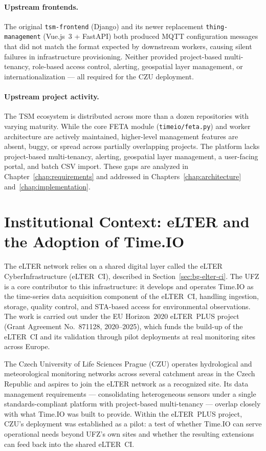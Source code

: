 \paragraph{Upstream frontends.}
The original \texttt{tsm-frontend} (Django) and its newer replacement \texttt{thing-management}
(Vue.js~3 + FastAPI) both produced MQTT configuration messages that did not match the format
expected by downstream workers, causing silent failures in infrastructure provisioning.
Neither provided project-based multi-tenancy, role-based access control, alerting, geospatial
layer management, or internationalization --- all required for the CZU deployment.

\paragraph{Upstream project activity.}
The TSM ecosystem is distributed across more than a dozen repositories with varying maturity.
While the core FETA module (\texttt{timeio/feta.py}) and worker architecture are actively
maintained, higher-level management features are absent, buggy, or spread across partially
overlapping projects. The platform lacks project-based multi-tenancy, alerting, geospatial
layer management, a user-facing portal, and batch CSV import. These gaps are analyzed in
Chapter~\ref{chap:requirements} and addressed in Chapters~\ref{chap:architecture}
and~\ref{chap:implementation}.

\section{Institutional Context: eLTER and the Adoption of Time.IO}
\label{sec:bg-elter-context}

The eLTER network relies on a shared digital layer called the eLTER CyberInfrastructure
(eLTER~CI), described in Section~\ref{sec:bg-elter-ci}. The UFZ is a core contributor to
this infrastructure: it develops and operates Time.IO as the time-series data acquisition
component of the eLTER~CI, handling ingestion, storage, quality control, and STA-based
access for environmental observations. The work is carried out under the EU Horizon~2020
eLTER~PLUS project (Grant Agreement No.~871128, 2020--2025), which funds the build-up of
the eLTER~CI and its validation through pilot deployments at real monitoring sites across
Europe.

The Czech University of Life Sciences Prague (CZU) operates hydrological and meteorological
monitoring networks across several catchment areas in the Czech Republic and aspires to
join the eLTER network as a recognized site. Its data management requirements ---
consolidating heterogeneous sensors under a single standards-compliant platform with
project-based multi-tenancy --- overlap closely with what Time.IO was built to provide.
Within the eLTER~PLUS project, CZU's deployment was established as a pilot: a test of
whether Time.IO can serve operational needs beyond UFZ's own sites and whether the
resulting extensions can feed back into the shared eLTER~CI.

